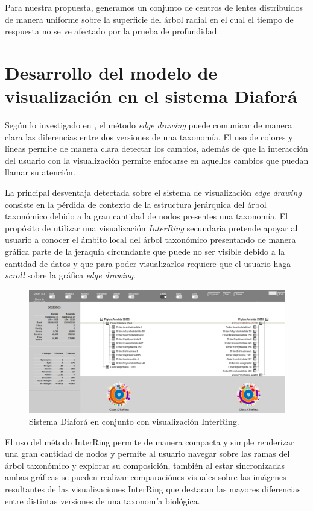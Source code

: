 \documentclass[journal]{IEEEtran}
\begin{document}
Para nuestra propuesta, generamos un conjunto de centros de lentes distribuidos de manera uniforme sobre la superficie del árbol radial en el cual el tiempo de respuesta no se ve afectado por la prueba de profundidad. 


\section{Desarrollo del modelo de visualización en el sistema Diaforá}
Según lo investigado en \cite{sancho_diafora}, el método \emph{edge drawing} puede comunicar de manera clara las
diferencias entre dos versiones de una taxonomía. El uso de colores y líneas permite de manera clara detectar los
cambios, además de que la interacción del usuario con la visualización permite enfocarse en aquellos cambios que 
puedan llamar su atención.

La principal desventaja detectada sobre el sistema de visualización \emph{edge drawing} consiste en la pérdida de contexto
de la estructura jerárquica del árbol taxonómico debido a la gran cantidad de nodos presentes una taxonomía.
El propósito de utilizar una visualización \emph{InterRing}\cite{yang_ward_rundensteiner} secundaria pretende apoyar al usuario a conocer
el ámbito local del árbol taxonómico presentando de manera gráfica parte de la jeraquía circundante que puede no ser visible debido a la cantidad de datos
y que para poder visualizarlos requiere que el usuario haga \emph{scroll} sobre la gráfica \emph{edge drawing}.

\begin{figure}[]
  \centering
  \includegraphics[scale=0.20]{extend_diafora.png}
  \caption{Sistema Diaforá en conjunto con visualización InterRing.}
  \label{}
\end{figure}

El uso del método InterRing permite de manera compacta y simple renderizar una gran cantidad de nodos y permite al usuario navegar sobre las ramas 
del árbol taxonómico y explorar su composición, también al estar sincronizadas ambas gráficas se pueden realizar comparaciónes 
visuales sobre las imágenes resultantes de las visualizaciones InterRing que destacan las mayores diferencias entre distintas versiones de una taxonomía biológica.
\end{document}
